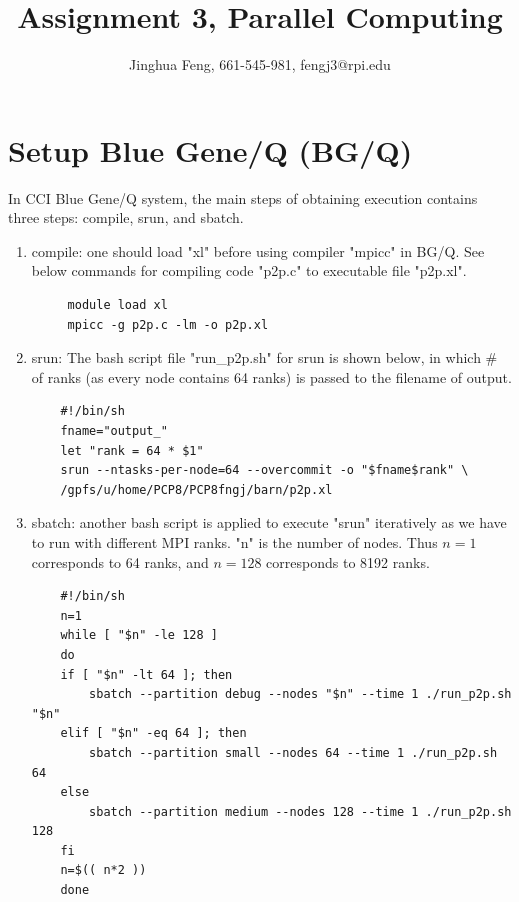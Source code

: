 \documentclass{article}
\title{Assignment 3, Parallel Computing}
\author{Jinghua Feng, 661-545-981, fengj3@rpi.edu}
\begin{document}
\maketitle
\section{Setup Blue Gene/Q (BG/Q)}
In CCI Blue Gene/Q system, the main steps of obtaining execution contains three steps: compile, srun, and sbatch.
\begin{enumerate}[label=(\alph*)]
	\item compile: one should load "xl" before using compiler "mpicc" in BG/Q. See below commands for compiling code "p2p.c" to executable file "p2p.xl".
	\begin{verbatim}
	 module load xl
	 mpicc -g p2p.c -lm -o p2p.xl
	\end{verbatim}
	\item srun: The bash script file "run\_p2p.sh" for srun is shown below, in which \# of ranks (as every node contains 64 ranks) is passed to the filename of output.
	\begin{verbatim}
	#!/bin/sh
	fname="output_"
	let "rank = 64 * $1"
	srun --ntasks-per-node=64 --overcommit -o "$fname$rank" \
	/gpfs/u/home/PCP8/PCP8fngj/barn/p2p.xl
	\end{verbatim}
	\item sbatch: another bash script is applied to execute "srun" iteratively as we have to run with different MPI ranks. "n" is the number of nodes. Thus $n=1$ corresponds to 64 ranks, and $n=128$ corresponds to 8192 ranks.
	\begin{verbatim}
	#!/bin/sh
	n=1
	while [ "$n" -le 128 ]
	do
	if [ "$n" -lt 64 ]; then
	    sbatch --partition debug --nodes "$n" --time 1 ./run_p2p.sh "$n"
	elif [ "$n" -eq 64 ]; then
	    sbatch --partition small --nodes 64 --time 1 ./run_p2p.sh 64
	else
	    sbatch --partition medium --nodes 128 --time 1 ./run_p2p.sh 128
	fi
	n=$(( n*2 ))
	done
	
	\end{verbatim}
\end{enumerate}
\end{document}
